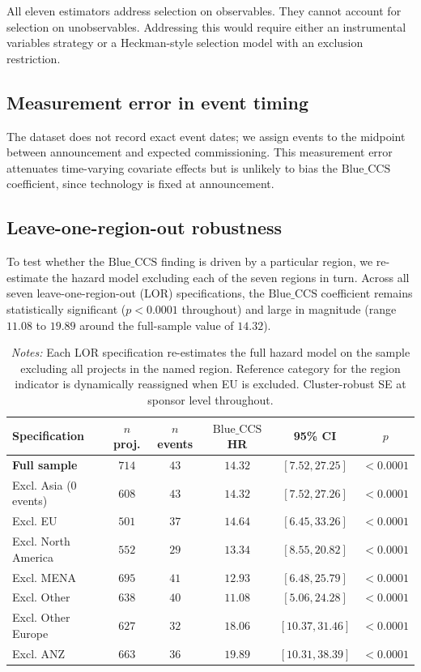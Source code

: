 \documentclass[review,authoryear,11pt]{elsarticle}
\newcommand{\BlueCCS}{\mathrm{Blue\_CCS}}
\begin{document}
All eleven estimators address selection on observables. They cannot account for selection on unobservables. Addressing this would require either an instrumental variables strategy or a Heckman-style selection model \citep{Heckman1979} with an exclusion restriction.

\subsection{Measurement error in event timing}

The dataset does not record exact event dates; we assign events to the midpoint between announcement and expected commissioning. This measurement error attenuates time-varying covariate effects but is unlikely to bias the $\BlueCCS$ coefficient, since technology is fixed at announcement.

\subsection{Leave-one-region-out robustness}

To test whether the $\BlueCCS$ finding is driven by a particular region, we re-estimate the hazard model excluding each of the seven regions in turn. Across all seven leave-one-region-out (LOR) specifications, the $\BlueCCS$ coefficient remains statistically significant ($p < 0.0001$ throughout) and large in magnitude (range $11.08$ to $19.89$ around the full-sample value of $14.32$).

\begin{table}[H]
\centering
\caption{Leave-one-region-out robustness.}
\label{tab:lor}
\small
\begin{tabular}{lccccc}
\toprule
\textbf{Specification} & \textbf{$n$ proj.} & \textbf{$n$ events} & \textbf{$\BlueCCS$ HR} & \textbf{95\% CI} & \textbf{$p$} \\
\midrule
\textbf{Full sample} & $714$ & $43$ & $\mathbf{14.32}$ & $[7.52, 27.25]$ & $<0.0001$ \\
Excl. Asia (0 events) & $608$ & $43$ & $14.32$ & $[7.52, 27.26]$ & $<0.0001$ \\
Excl. EU & $501$ & $37$ & $14.64$ & $[6.45, 33.26]$ & $<0.0001$ \\
Excl. North America & $552$ & $29$ & $13.34$ & $[8.55, 20.82]$ & $<0.0001$ \\
Excl. MENA & $695$ & $41$ & $12.93$ & $[6.48, 25.79]$ & $<0.0001$ \\
Excl. Other & $638$ & $40$ & $11.08$ & $[5.06, 24.28]$ & $<0.0001$ \\
Excl. Other Europe & $627$ & $32$ & $18.06$ & $[10.37, 31.46]$ & $<0.0001$ \\
Excl. ANZ & $663$ & $36$ & $19.89$ & $[10.31, 38.39]$ & $<0.0001$ \\
\bottomrule
\end{tabular}
\caption*{\footnotesize \textit{Notes:} Each LOR specification re-estimates the full hazard model on the sample excluding all projects in the named region. Reference category for the region indicator is dynamically reassigned when EU is excluded. Cluster-robust SE at sponsor level throughout.}
\end{table}
\end{document}
